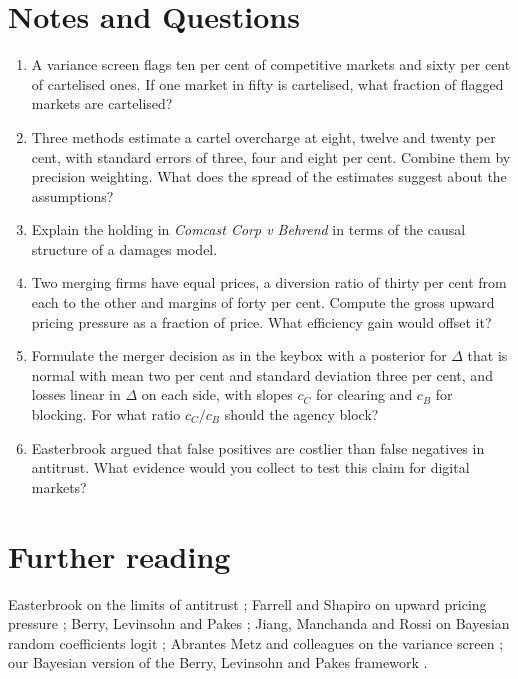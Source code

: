 \section*{Notes and Questions}
\begin{enumerate}[label=\arabic*.]
\item A variance screen flags ten per cent of competitive markets and sixty per cent of cartelised ones. If one market in fifty is cartelised, what fraction of flagged markets are cartelised?
\item Three methods estimate a cartel overcharge at eight, twelve and twenty per cent, with standard errors of three, four and eight per cent. Combine them by precision weighting. What does the spread of the estimates suggest about the assumptions?
\item Explain the holding in \emph{Comcast Corp v Behrend} in terms of the causal structure of a damages model.
\item Two merging firms have equal prices, a diversion ratio of thirty per cent from each to the other and margins of forty per cent. Compute the gross upward pricing pressure as a fraction of price. What efficiency gain would offset it?
\item Formulate the merger decision as in the keybox with a posterior for $\Delta$ that is normal with mean two per cent and standard deviation three per cent, and losses linear in $\Delta$ on each side, with slopes $c_C$ for clearing and $c_B$ for blocking. For what ratio $c_C/c_B$ should the agency block?
\item Easterbrook argued that false positives are costlier than false negatives in antitrust. What evidence would you collect to test this claim for digital markets?
\end{enumerate}

\section*{Further reading}
Easterbrook on the limits of antitrust \citep{easterbrook1984}; Farrell and Shapiro on upward pricing pressure \citep{farrell2010}; Berry, Levinsohn and Pakes \citep{blp1995}; Jiang, Manchanda and Rossi on Bayesian random coefficients logit \citep{jiang2009}; Abrantes Metz and colleagues on the variance screen \citep{abrantes2006}; our Bayesian version of the Berry, Levinsohn and Pakes framework \citep{polson_sokolov_blp}.
